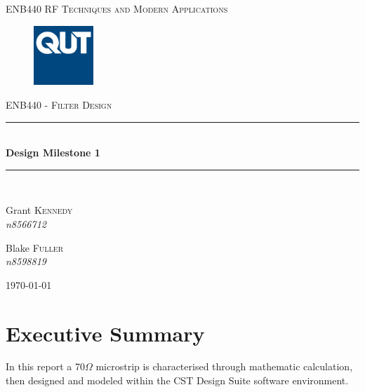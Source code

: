 \documentclass{paper}
\newcommand{\HRule}{\rule{\linewidth}{0.5mm}}
\begin{document}
\newpage
\begin{titlepage}
\begin{center}

\textsc{\LARGE ENB440 RF Techniques and Modern Applications}\\[0.75cm]

\begin{figure}[H]
\centering
\includegraphics[width=0.2\textwidth]{IMG/QUT} \\[0.75cm]
\end{figure}

\textsc{\Large ENB440 - Filter Design}\\[0.5cm]

\HRule \\[0.4cm]
{ \huge \bfseries Design Milestone 1 \\[0.4cm] }

\HRule \\[1.5cm]



\begin{minipage}{0.4\textwidth}
\begin{flushleft} \large
Grant \textsc{Kennedy} \\
\emph{n8566712}\\
\end{flushleft}
\end{minipage}
\begin{minipage}{0.4\textwidth}
\begin{flushright} \large
Blake \textsc{Fuller} \\
\emph{n8598819}\\
\end{flushright}
\end{minipage}

\vfill

{\large \today}
\end{center}
\end{titlepage}

\section*{Executive Summary}
In this report a 70$\Omega$ microstrip is characterised through mathematic calculation, then designed and modeled within the CST Design Suite software environment.\\
\end{document}

